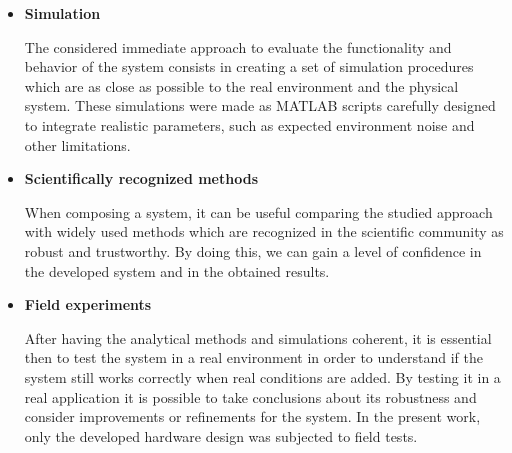 \begin{itemize}
	
	\item \textbf{Simulation}
	
	The considered immediate approach to evaluate the functionality and behavior of the system consists in creating a set of simulation procedures which are as close as possible to the real environment and the physical system. These simulations were made as MATLAB scripts carefully designed to integrate realistic parameters, such as expected environment noise and other limitations.
	
	\item \textbf{Scientifically recognized methods}
	
	When composing a system, it can be useful comparing the studied approach with widely used methods which are recognized in the scientific community as robust and trustworthy. By doing this, we can gain a level of confidence in the developed system and in the obtained results.
	
	\item \textbf{Field experiments}
	
	After having the analytical methods and simulations coherent, it is essential then to test the system in a real environment in order to understand if the system still works correctly when real conditions are added. By testing it in a real application it is possible to take conclusions about its robustness and consider improvements or refinements for the system.
	In the present work, only the developed hardware design was subjected to field tests.

\end{itemize}
